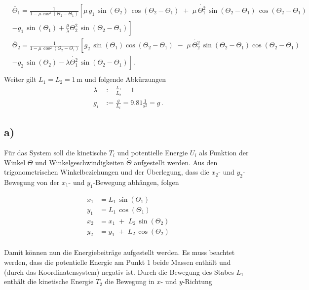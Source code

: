 \begin{equation}
	\begin{split}
		&\ddot{\Theta_1} = \frac{1}{1-\mu \cos^2(\Theta_2-\Theta_1)} \left[ \mu\,g_1\,\sin(\Theta_2)\,\cos(\Theta_2-\Theta_1)\,\, + \,\, \mu\,\dot{\Theta_1^2}\,\sin(\Theta_2-\Theta_1)\,\cos(\Theta_2-\Theta_1)\right.  \\
		&\left.-g_1\,\sin(\Theta_1)+ \frac{\mu}{\lambda} \dot{\Theta_2^2}\,\sin(\Theta_2-\Theta_1)\right]\\
		&\ddot{\Theta_2} = \frac{1}{1-\mu\,\cos^2(\Theta_2-\Theta_1)}\left[g_2\,\sin(\Theta_1)\cos(\Theta_2-\Theta_1)\,\,-\,\,\mu\,\dot{\Theta_2^2}\,\sin(\Theta_2-\Theta_1)\cos(\Theta_2-\Theta_1)\right. \\
		&\left.-g_2\,\sin(\Theta_2)-\lambda\dot{\Theta_1^2}\,\sin(\Theta_2-\Theta_1)\right]\,. \\
	\end{split}
\label{eq:DGL}
\end{equation}
Weiter gilt $L_1 = L_2 = 1\,\mathup{m}$ und folgende Abkürzungen
\begin{equation*}
	\begin{split}
		 \lambda &:= \frac{L_1}{L_2} = 1 \\
		 g_i &:= \frac{g}{L_i} = 9.81 \frac{1}{\mathup{s}^2} = g \,.
	\end{split}
\end{equation*}
\subsection*{a)}
Für das System soll die kinetische $T_i$ und potentielle Energie $U_i$ als Funktion der Winkel $\Theta$ und Winkelgeschwindigkeiten $\dot{\Theta}$ aufgestellt werden.
Aus den trigonometrischen Winkelbeziehungen und der Überlegung, dass die $x_2$- und $y_2$-Bewegung von der $x_1$- und $y_1$-Bewegung abhängen, folgen

\begin{equation*}
	\begin{split}
		x_1 &= L_1\,\sin(\Theta_1) \\
		y_1 &= L_1\,\cos(\Theta_1) \\
		x_2 &= x_1\,\,+\,\,L_2\,\sin(\Theta_2)\\
		y_2 &= y_1\,\,+\,\,L_2\,\cos(\Theta_2)\\
	\end{split}	
\end{equation*}

Damit können nun die Energiebeiträge aufgestellt werden. Es muss beachtet werden, dass die potentielle Energie am Punkt 1 beide Massen enthält und (durch das Koordinatensystem) negativ ist. Durch die Bewegung des Stabes $L_1$ enthält die kinetische Energie $T_2$ die Bewegung in $x$- und $y$-Richtung

